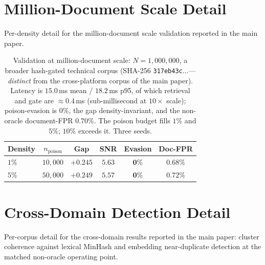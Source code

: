 \documentclass[10pt,journal,compsoc]{IEEEtran}
\begin{document}
\section{Million-Document Scale Detail}
\label{app:scale}
Per-density detail for the million-document scale validation reported in the main paper.

\begin{table}[t]
\centering
\caption{Validation at million-document scale: $N=1{,}000{,}000$, a broader hash-gated
technical corpus (SHA-256 \texttt{317eb43c}$\dots$---\emph{distinct} from the
cross-platform corpus of the main paper). Latency is $15.0$\,ms mean / $18.2$\,ms p95,
of which retrieval and gate are $\approx\!0.4$\,ms (sub-millisecond at $10\times$ scale);
poison-evasion is $0\%$, the gap density-invariant, and the non-oracle document-FPR
$0.70\%$. The poison budget fills $1\%$ and $5\%$; $10\%$ exceeds it. Three seeds.}
\label{tab:scale}
\begin{tabular}{lccccc}
\toprule
Density & $n_{\mathrm{poison}}$ & Gap & SNR & Evasion & Doc-FPR \\
\midrule
$1\%$ & $10{,}000$ & $+0.245$ & $5.63$ & $\mathbf{0\%}$ & $0.68\%$ \\
$5\%$ & $50{,}000$ & $+0.249$ & $5.57$ & $\mathbf{0\%}$ & $0.72\%$ \\
\bottomrule
\end{tabular}
\end{table}

\section{Cross-Domain Detection Detail}
\label{app:xdomain}
Per-corpus detail for the cross-domain results reported in the main paper: cluster coherence against lexical MinHash and embedding near-duplicate detection at the matched non-oracle operating point.
\end{document}
